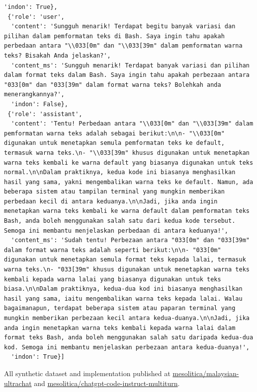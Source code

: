 \documentclass{article}
\begin{document}
\begin{lstlisting}[breaklines=true]
  'indon': True},
 {'role': 'user',
  'content': 'Sungguh menarik! Terdapat begitu banyak variasi dan pilihan dalam pemformatan teks di Bash. Saya ingin tahu apakah perbedaan antara "\\033[0m" dan "\\033[39m" dalam pemformatan warna teks? Bisakah Anda jelaskan?',
  'content_ms': 'Sungguh menarik! Terdapat banyak variasi dan pilihan dalam format teks dalam Bash. Saya ingin tahu apakah perbezaan antara "033[0m" dan "033[39m" dalam format warna teks? Bolehkah anda menerangkannya?',
  'indon': False},
 {'role': 'assistant',
  'content': 'Tentu! Perbedaan antara "\\033[0m" dan "\\033[39m" dalam pemformatan warna teks adalah sebagai berikut:\n\n- "\\033[0m" digunakan untuk menetapkan semula pemformatan teks ke default, termasuk warna teks.\n- "\\033[39m" khusus digunakan untuk menetapkan warna teks kembali ke warna default yang biasanya digunakan untuk teks normal.\n\nDalam praktiknya, kedua kode ini biasanya menghasilkan hasil yang sama, yakni mengembalikan warna teks ke default. Namun, ada beberapa sistem atau tampilan terminal yang mungkin memberikan perbedaan kecil di antara keduanya.\n\nJadi, jika anda ingin menetapkan warna teks kembali ke warna default dalam pemformatan teks Bash, anda boleh menggunakan salah satu dari kedua kode tersebut. Semoga ini membantu menjelaskan perbedaan di antara keduanya!',
  'content_ms': 'Sudah tentu! Perbezaan antara "033[0m" dan "033[39m" dalam format warna teks adalah seperti berikut:\n\n- "033[0m" digunakan untuk menetapkan semula format teks kepada lalai, termasuk warna teks.\n- "033[39m" khusus digunakan untuk menetapkan warna teks kembali kepada warna lalai yang biasanya digunakan untuk teks biasa.\n\nDalam praktiknya, kedua-dua kod ini biasanya menghasilkan hasil yang sama, iaitu mengembalikan warna teks kepada lalai. Walau bagaimanapun, terdapat beberapa sistem atau paparan terminal yang mungkin memberikan perbezaan kecil antara kedua-duanya.\n\nJadi, jika anda ingin menetapkan warna teks kembali kepada warna lalai dalam format teks Bash, anda boleh menggunakan salah satu daripada kedua-dua kod. Semoga ini membantu menjelaskan perbezaan antara kedua-duanya!',
  'indon': True}]
\end{lstlisting}

All synthetic dataset and implementation published at \href{https://huggingface.co/datasets/mesolitica/malaysian-ultrachat}{mesolitica/malaysian-ultrachat} and \href{https://huggingface.co/datasets/mesolitica/chatgpt-code-instruct-multiturn}{mesolitica/chatgpt-code-instruct-multiturn}.
\end{document}
